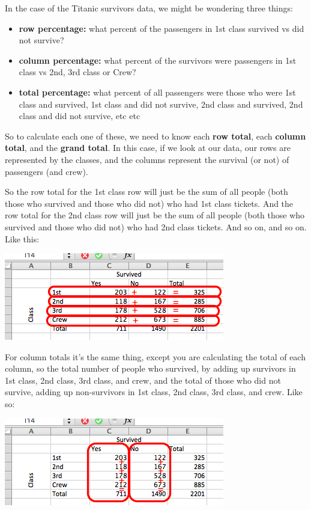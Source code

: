 \documentclass[]{book}
\providecommand{\tightlist}{%
  \setlength{\itemsep}{0pt}\setlength{\parskip}{0pt}}
\theoremstyle{definition}
\theoremstyle{definition}
\theoremstyle{definition}
\theoremstyle{remark}
\begin{document}
In the case of the Titanic survivors data, we might be wondering three
things:

\begin{itemize}
\tightlist
\item
  \textbf{row percentage:} what percent of the passengers in 1st class
  survived vs did not survive?
\item
  \textbf{column percentage:} what percent of the survivors were
  passengers in 1st class vs 2nd, 3rd class or Crew?
\item
  \textbf{total percentage:} what percent of all passengers were those
  who were 1st class and survived, 1st class and did not survive, 2nd
  class and survived, 2nd class and did not survive, etc etc
\end{itemize}

So to calculate each one of these, we need to know each \textbf{row
total}, each \textbf{column total}, and the \textbf{grand total}. In
this case, if we look at our data, our rows are represented by the
classes, and the columns represent the survival (or not) of passengers
(and crew).

So the row total for the 1st class row will just be the sum of all
people (both those who survived and those who did not) who had 1st class
tickets. And the row total for the 2nd class row will just be the sum of
all people (both those who survived and those who did not) who had 2nd
class tickets. And so on, and so on. Like this:

\includegraphics{imgs/titanic_row_total_calc.png}

For column totals it's the same thing, except you are calculating the
total of each column, so the total number of people who survived, by
adding up survivors in 1st class, 2nd class, 3rd class, and crew, and
the total of those who did not survive, adding up non-survivors in 1st
class, 2nd class, 3rd class, and crew. Like so:

\includegraphics{imgs/titanic_col_total_calc.png}
\end{document}
